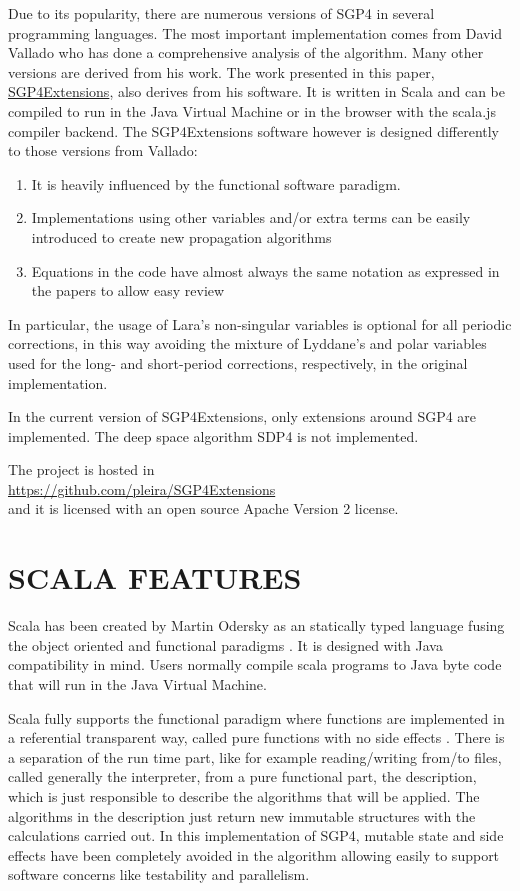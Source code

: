 \documentclass{article}
\begin{document}
Due to its popularity, there are numerous versions of SGP4 in several programming languages. The most important implementation comes from David Vallado \cite{ValladoCrawfordHujsakKelso2006} who has done a comprehensive analysis of the algorithm. Many other versions are derived from his work. The work presented in this paper, \href{https://github.com/pleira/SGP4Extensions}{SGP4Extensions}, also derives from his software.
It is written in Scala and can be compiled to run in the Java Virtual Machine or in the browser with the scala.js compiler backend. The SGP4Extensions software however is designed differently to those versions from Vallado:
\begin{enumerate}
  \item  It is heavily influenced by the functional software paradigm.
  \item  Implementations using other variables and/or extra terms can be easily introduced to create new propagation algorithms
  \item  Equations in the code have almost always the same notation as expressed in the papers to allow easy review
\end{enumerate}
In particular, the usage of Lara's non-singular variables \cite{Lara2015MPE} is optional for all periodic corrections, in this way avoiding the mixture of Lyddane's and polar variables used for the long- and short-period corrections, respectively, in the original implementation.

In the current version of SGP4Extensions, only extensions around SGP4 are implemented. The deep space algorithm SDP4 is not implemented.

The project is hosted in\\
\url{https://github.com/pleira/SGP4Extensions} \\
and it is licensed with an open source Apache Version 2 license.

\section{SCALA FEATURES}
\label{sec:scala}

Scala has been created by Martin Odersky as an statically typed language fusing the object oriented and functional paradigms \cite{scala-overview-tech-report}. It is designed with Java compatibility in mind. Users normally compile scala programs to Java byte code that will run in the Java Virtual Machine.

Scala fully supports the functional paradigm where functions are implemented in a referential transparent way, called pure functions with no side effects \cite[p. ~3]{ChBj}. There is a separation of the run time part, like for example reading/writing from/to files, called generally the interpreter, from a pure functional part, the description, which is just responsible to describe the algorithms that will be applied. The algorithms in the description just return new immutable structures with the calculations carried out.
In this implementation of SGP4, mutable state and side effects have been completely avoided in the algorithm allowing easily to support software concerns like testability and parallelism.
\end{document}
